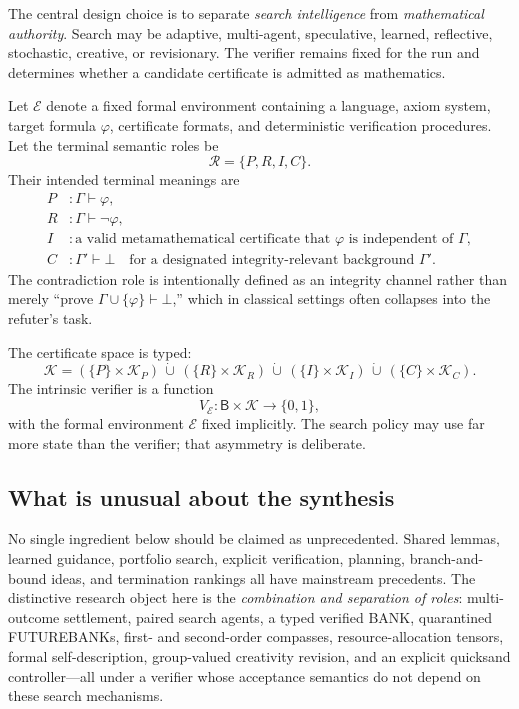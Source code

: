 \documentclass[11pt]{article}
\newcommand{\Bank}{\mathsf{B}}
\newcommand{\Cert}{\mathcal{K}}
\newcommand{\Env}{\mathcal{E}}
\newcommand{\Verify}{V_{\Env}}
\begin{document}
The central design choice is to separate \emph{search intelligence} from \emph{mathematical authority}. Search may be adaptive, multi-agent, speculative, learned, reflective, stochastic, creative, or revisionary. The verifier remains fixed for the run and determines whether a candidate certificate is admitted as mathematics.

Let $\Env$ denote a fixed formal environment containing a language, axiom system, target formula $\varphi$, certificate formats, and deterministic verification procedures. Let the terminal semantic roles be
\[
\mathcal R=\{P,R,I,C\}.
\]
Their intended terminal meanings are
\begin{align*}
P &: \Gamma\vdash\varphi,\\
R &: \Gamma\vdash\neg\varphi,\\
I &: \text{a valid metamathematical certificate that $\varphi$ is independent of $\Gamma$},\\
C &: \Gamma'\vdash\bot\quad\text{for a designated integrity-relevant background $\Gamma'$.}
\end{align*}
The contradiction role is intentionally defined as an integrity channel rather than merely ``prove $\Gamma\cup\{\varphi\}\vdash\bot$,'' which in classical settings often collapses into the refuter's task.

The certificate space is typed:
\[
\Cert= (\{P\}\times\Cert_P)\,\dot\cup\,(\{R\}\times\Cert_R)\,\dot\cup\,(\{I\}\times\Cert_I)\,\dot\cup\,(\{C\}\times\Cert_C).
\]
The intrinsic verifier is a function
\[
\Verify:\Bank\times\Cert\to\{0,1\},
\]
with the formal environment $\Env$ fixed implicitly. The search policy may use far more state than the verifier; that asymmetry is deliberate.

\subsection{What is unusual about the synthesis}

No single ingredient below should be claimed as unprecedented. Shared lemmas, learned guidance, portfolio search, explicit verification, planning, branch-and-bound ideas, and termination rankings all have mainstream precedents. The distinctive research object here is the \emph{combination and separation of roles}: multi-outcome settlement, paired search agents, a typed verified BANK, quarantined FUTUREBANKs, first- and second-order compasses, resource-allocation tensors, formal self-description, group-valued creativity revision, and an explicit quicksand controller---all under a verifier whose acceptance semantics do not depend on these search mechanisms.
\end{document}
